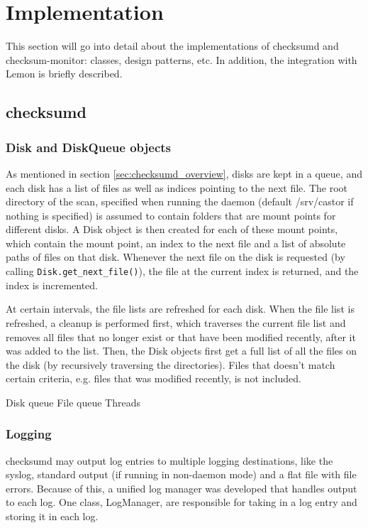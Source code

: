 \section{Implementation}
This section will go into detail about the implementations of checksumd and checksum-monitor: classes, design patterns, etc. In addition, the integration with Lemon is briefly described.

\subsection{checksumd}

\subsubsection{Disk and DiskQueue objects}
As mentioned in section \ref{sec:checksumd_overview}, disks are kept in a queue, and each disk has a list of files as well as indices pointing to the next file. The root directory of the scan, specified when running the daemon (default /srv/castor if nothing is specified) is assumed to contain folders that are mount points for different disks. A Disk object is then created for each of these mount points, which contain the mount point, an index to the next file and a list of absolute paths of files on that disk. Whenever the next file on the disk is requested (by calling {\tt Disk.get\_next\_file()}), the file at the current index is returned, and the index is incremented.

At certain intervals, the file lists are refreshed for each disk. When the file list is refreshed, a cleanup is performed first, which traverses the current file list and removes all files that no longer exist or that have been modified recently, after it was added to the list. Then, the Disk objects first get a full list of all the files on the disk (by recursively traversing the directories). Files that doesn't match certain criteria, e.g. files that was modified recently, is not included.


Disk queue
File queue
Threads

\subsubsection{Logging}
checksumd may output log entries to multiple logging destinations, like the syslog, standard output (if running in non-daemon mode) and a flat file with file errors. Because of this, a unified log manager was developed that handles output to each log. One class, LogManager, are responsible for taking in a log entry and storing it in each log.  

